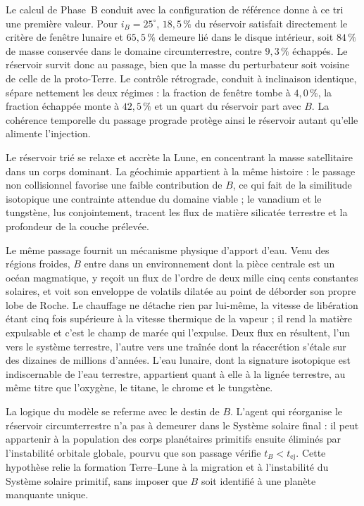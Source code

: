 \documentclass[11pt,a4paper,openany]{report}
\begin{document}
Le calcul de Phase~B conduit avec la configuration de référence donne à ce tri une première
valeur. Pour $i_B=25^\circ$, $18{,}5\,\%$ du réservoir satisfait directement le critère de fenêtre
lunaire et $65{,}5\,\%$ demeure lié dans le disque intérieur, soit $84\,\%$ de masse conservée dans
le domaine circumterrestre, contre $9{,}3\,\%$ échappés. Le réservoir survit donc au passage, bien
que la masse du perturbateur soit voisine de celle de la proto-Terre. Le contrôle rétrograde, conduit
à inclinaison identique, sépare nettement les deux régimes : la fraction de fenêtre tombe à
$4{,}0\,\%$, la fraction échappée monte à $42{,}5\,\%$ et un quart du réservoir part avec $B$. La
cohérence temporelle du passage prograde protège ainsi le réservoir autant qu'elle alimente
l'injection.

Le réservoir trié se relaxe et accrète la Lune, en concentrant la masse satellitaire dans un corps
dominant. La géochimie appartient à la même histoire : le passage non collisionnel favorise une
faible contribution de $B$, ce qui fait de la similitude isotopique une contrainte attendue du
domaine viable ; le vanadium et le tungstène, lus conjointement, tracent les flux de matière
silicatée terrestre et la profondeur de la couche prélevée.

Le même passage fournit un mécanisme physique d'apport d'eau. Venu des régions froides, $B$ entre dans un environnement
dont la pièce centrale est un océan magmatique, y reçoit un flux de l'ordre de deux mille cinq cents
constantes solaires, et voit son enveloppe de volatils dilatée au point de déborder son propre lobe
de Roche. Le chauffage ne détache rien par lui-même, la vitesse de libération étant cinq fois
supérieure à la vitesse thermique de la vapeur ; il rend la matière expulsable et c'est le champ de
marée qui l'expulse. Deux flux en résultent, l'un vers le système terrestre, l'autre vers une traînée
dont la réaccrétion s'étale sur des dizaines de millions d'années. L'eau lunaire, dont la signature
isotopique est indiscernable de l'eau terrestre, appartient quant à elle à la lignée terrestre, au
même titre que l'oxygène, le titane, le chrome et le tungstène.

La logique du modèle se referme avec le destin de $B$. L'agent qui réorganise le réservoir
circumterrestre n'a pas à demeurer dans le Système solaire final : il peut appartenir à la population
des corps planétaires primitifs ensuite éliminés par l'instabilité orbitale globale, pourvu que son
passage vérifie $t_B<t_{\mathrm{ej}}$. Cette hypothèse relie la formation Terre--Lune à la migration
et à l'instabilité du Système solaire primitif, sans imposer que $B$ soit identifié à une planète
manquante unique.
\end{document}

